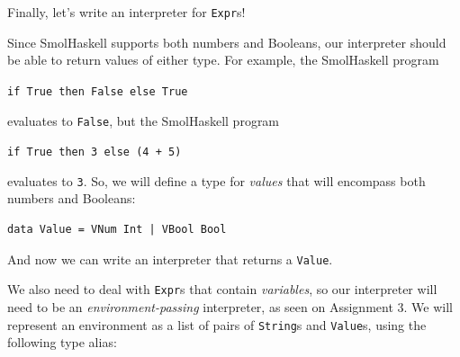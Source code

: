\documentclass[addpoints]{exam}
\begin{document}
\begin{questions}

\newpage

\question[15] Finally, let's write an interpreter for \verb|Expr|s!

Since SmolHaskell supports both numbers and Booleans, our interpreter should be able to return values of either type.  For example, the SmolHaskell program

\verb|if True then False else True|

evaluates to \verb|False|, but the SmolHaskell program

\verb|if True then 3 else (4 + 5)|

evaluates to \verb|3|.  So, we will define a type for \emph{values} that will encompass both numbers and Booleans:

\begin{verbatim}
data Value = VNum Int | VBool Bool
\end{verbatim}

And now we can write an interpreter that returns a \verb|Value|.

We also need to deal with \verb|Expr|s that contain \emph{variables}, so our interpreter will need to be an \emph{environment-passing} interpreter, as seen on Assignment 3.  We will represent an environment as a list of pairs of \verb|String|s and \verb|Value|s, using the following type alias:


\end{questions}
\end{document}
